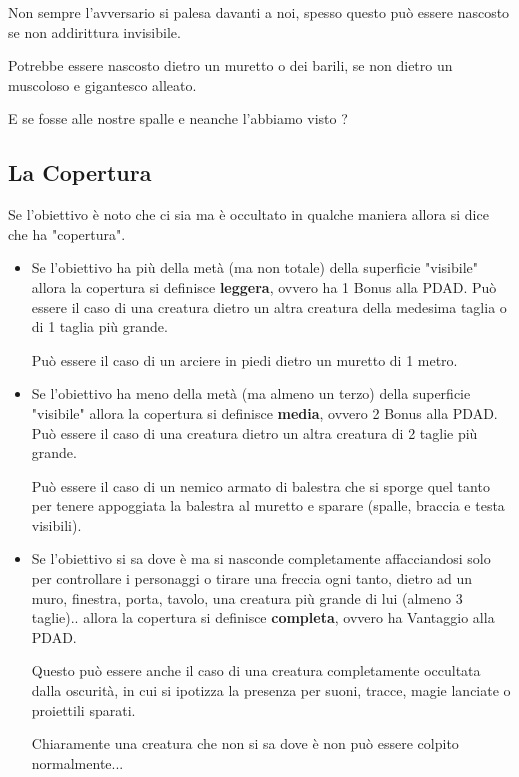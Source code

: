 \documentclass[12pt,a4paper,twoside,openany]{book}
\begin{document}
\begin{multicols}{2}
	
Non sempre l'avversario si palesa davanti a noi, spesso questo può essere nascosto se non addirittura invisibile.
	
Potrebbe essere nascosto dietro un muretto o dei barili, se non dietro un muscoloso e gigantesco alleato.

E se fosse alle nostre spalle e neanche l'abbiamo visto ?
	
\subsection{La Copertura}\label{copertura}
	
Se l'obiettivo è noto che ci sia ma è occultato in qualche maniera allora si dice che ha "copertura".
	
\begin{itemize}
\item
Se l'obiettivo ha più della metà (ma non totale) della superficie "visibile" allora la copertura si definisce \textbf{leggera}, ovvero ha 1 Bonus alla PDAD. Può essere il caso di una creatura dietro un altra creatura della medesima taglia o di 1 taglia più grande.
		
Può essere il caso di un arciere in piedi dietro un muretto di 1 metro.
		
\item
Se l'obiettivo ha meno della metà (ma almeno un terzo) della superficie "visibile" allora la copertura si definisce \textbf{media}, ovvero 2 Bonus alla PDAD. Può essere il caso di una creatura dietro un altra creatura di 2 taglie più grande.
		
Può essere il caso di un nemico armato di balestra che si sporge quel tanto per tenere appoggiata la balestra al muretto e sparare (spalle, braccia e testa visibili).
		
\item
Se l'obiettivo si sa dove è ma si nasconde completamente affacciandosi solo per controllare i personaggi o tirare una freccia ogni tanto, dietro ad un muro, finestra, porta, tavolo, una creatura più grande di lui (almeno 3 taglie).. allora la copertura si definisce \textbf{completa}, ovvero ha Vantaggio alla PDAD.

Questo può essere anche il caso di una creatura completamente occultata dalla oscurità, in cui si ipotizza la presenza per suoni, tracce, magie lanciate o proiettili sparati.
		
Chiaramente una creatura che non si sa dove è non può essere colpito normalmente...
		

\end{itemize}
\end{multicols}
\end{document}
